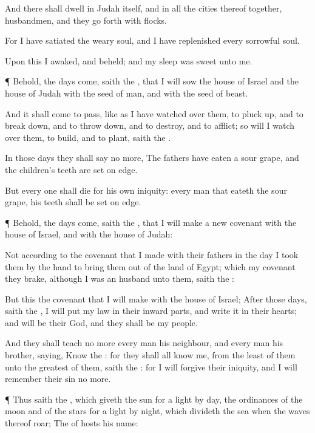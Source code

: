 {And there shall
dwell in
Judah itself, and in all the
cities thereof
together,
husbandmen, and they
{} go
forth with
flocks.

For I have
satiated the
weary
soul, and I have
replenished every
sorrowful
soul.

Upon this I
awaked, and
beheld; and my
sleep was
sweet unto me.


\par }{\PP {}¶ Behold, the
days
come,
saith the
{}, that I will
sow the
house of
Israel and the
house of
Judah with the
seed of
man, and with the
seed of
beast.

And it shall come to pass,
{} like as I have watched
over them, to pluck
up, and to break
down, and to throw
down, and to
destroy, and to
afflict; so will I watch
over them, to
build, and to
plant,
saith the
{}.

In those
days they shall
say no more, The
fathers have
eaten a sour
grape, and the
children’s
teeth are set on
edge.

But every
one shall
die for his own
iniquity: every
man that
eateth the sour
grape, his
teeth shall be set on
edge.


\par }{\PP {}¶ Behold, the
days
come,
saith the
{}, that I will
make a
new
covenant with the
house of
Israel, and with the
house of
Judah:

Not according to the
covenant that I
made with their
fathers in the
day
{} I
took them by the
hand to bring them
out of the
land of
Egypt; which my
covenant they
brake, although I was an
husband unto them,
saith the
{}:

But this
{} the
covenant that I will
make with the
house of
Israel;
After those
days,
saith the
{}, I will
put my
law in their inward
parts, and
write it in their
hearts; and will be their
God, and they shall be my
people.

And they shall
teach no more every
man his
neighbour, and every
man his
brother,
saying,
Know the
{}: for they shall all
know me, from the
least of them unto the
greatest of them,
saith the
{}: for I will
forgive their
iniquity, and I will
remember their
sin no more.


\par }{\PP {}¶ Thus
saith the
{}, which
giveth the
sun for a
light by
day,
{} the
ordinances of the
moon and of the
stars for a
light by
night, which
divideth the
sea when the
waves thereof
roar; The
{} of
hosts
{} his
name:

}
